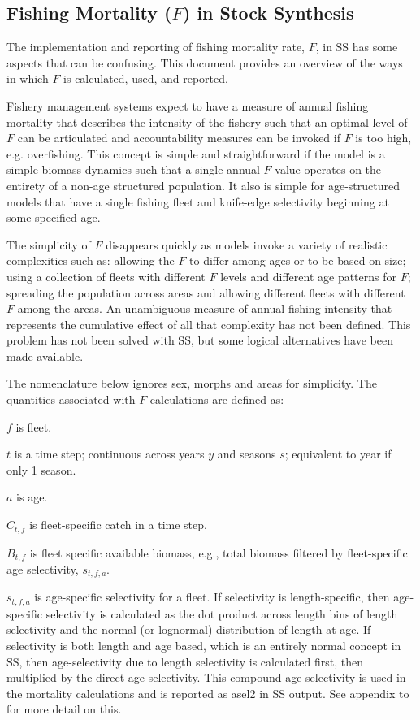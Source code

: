 \subsection{Fishing Mortality ($F$) in Stock Synthesis}

The implementation and reporting of fishing mortality rate, $F$, in SS has some aspects that can be confusing.  This document provides an overview of the ways in which $F$ is calculated, used, and reported.  

Fishery management systems expect to have a measure of annual fishing mortality that describes the intensity of the fishery such that an optimal level of $F$ can be articulated and accountability measures can be invoked if $F$ is too high, e.g. overfishing.  This concept is simple and straightforward if the model is a simple biomass dynamics such that a single annual $F$ value operates on the entirety of a non-age structured population.  It also is simple for age-structured models that have a single fishing fleet and knife-edge selectivity beginning at some specified age.

The simplicity of $F$ disappears quickly as models invoke a variety of realistic complexities such as: allowing the $F$ to differ among ages or to be based on size; using a collection of fleets with different $F$ levels and different age patterns for $F$; spreading the population across areas and allowing different fleets with different $F$ among the areas.  An unambiguous measure of annual fishing intensity that represents the cumulative effect of all that complexity has not been defined.  This problem has not been solved with SS, but some logical alternatives have been made available.

The nomenclature below ignores sex, morphs and areas for simplicity. The quantities associated with $F$ calculations are defined as:

$f$ is fleet.

$t$ is a time step; continuous across years $y$ and seasons $s$; equivalent to year if only 1 season.

$a$ is age.

$C_{t,f}$ is fleet-specific catch in a time step.

$B_{t,f}$ is fleet specific available biomass, e.g., total biomass filtered by fleet-specific age selectivity, $s_{t,f,a}$.

$s_{t,f,a}$ is age-specific selectivity for a fleet. If selectivity is length-specific, then age-specific selectivity is calculated as the dot product across length bins of length selectivity and the normal (or lognormal) distribution of length-at-age.  If selectivity is both length and age based, which is an entirely normal concept in SS, then age-selectivity due to length selectivity is calculated first, then multiplied by the direct age selectivity.  This compound age selectivity is used in the mortality calculations and is reported as asel2 in SS output.  See appendix to \citet{methot_stock_2013} for more detail on this.

